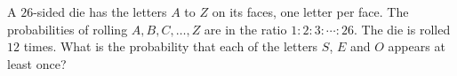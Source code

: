 A $26$-sided die has the letters $A$ to $Z$ on its faces, one letter per face. The probabilities of rolling $A,B,C,\dots,Z$ are in the ratio $1:2:3:\cdots:26$. The die is rolled $12$ times. What is the probability that each of the letters $S$, $E$ and $O$ appears at least once?
